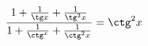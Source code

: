 \begin{ex}[type=prove_identity]
	\begin{condition}
		\( \dfrac{1+\frac{1}{\tg x}+\frac{1}{\tg^2x}}{1+\frac{1}{\ctg^x}+\frac{1}{\ctg^2x}}=\ctg^2x \)
	\end{condition}
\end{ex}